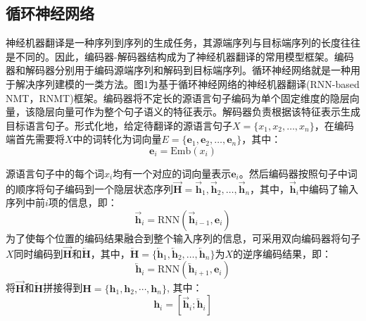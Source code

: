 \subsection{循环神经网络}
神经机器翻译是一种序列到序列的生成任务，其源端序列与目标端序列的长度往往是不同的。因此，编码器-解码器结构成为了神经机器翻译的常用模型框架。编码器和解码器分别用于编码源端序列和解码到目标端序列。循环神经网络就是一种用于解决序列建模的一类方法。图1为基于循环神经网络的神经机器翻译(RNN-based NMT，RNMT)框架。编码器将不定长的源语言句子编码为单个固定维度的隐层向量，该隐层向量可作为整个句子语义的特征表示。解码器负责根据该特征表示生成目标语言句子。形式化地，给定待翻译的源语言句子$X=\{x_1,x_2,…,x_n\}$，在编码端首先需要将$X$中的词转化为词向量$E=\{\boldsymbol{e}_1,\boldsymbol{e}_2,…,\boldsymbol{e}_n\}$，其中：
\begin{equation}
    \boldsymbol{e}_i=\mathrm{Emb}(x_i)
\end{equation}

源语言句子中的每个词$x_i$均有一个对应的词向量表示$\boldsymbol{e}_i$。然后编码器按照句子中词的顺序将句子编码到一个隐层状态序列$\overrightarrow{\boldsymbol{H}}={\overrightarrow{\boldsymbol{h}}_1,\overrightarrow{\boldsymbol{h}}_2,…,\overrightarrow{\boldsymbol{h}}_n}$，其中，$\overrightarrow{\boldsymbol{h}}_i$中编码了输入序列中前$i$项的信息，即：
\begin{equation}
    \overrightarrow{\boldsymbol{h}}_i=\mathrm{RNN}(\overrightarrow{\boldsymbol{h}}_{i-1},\boldsymbol{e}_i)
\end{equation}
为了使每个位置的编码结果融合到整个输入序列的信息，可采用双向编码器将句子$X$同时编码到$\overrightarrow{\boldsymbol{H}}$和$\overleftarrow{\boldsymbol{H}}$，其中，$\overleftarrow{\boldsymbol{H}}=\{\overleftarrow{\boldsymbol{h}}_1,\overleftarrow{\boldsymbol{h}}_2,…,\overleftarrow{\boldsymbol{h}}_n\}$为$X$的逆序编码结果，即：
\begin{equation}
    \overleftarrow{\boldsymbol{h}}_i=\mathrm{RNN}(\overleftarrow{\boldsymbol{h}}_{i+1},\boldsymbol{e}_i)
\end{equation}
将$\overrightarrow{\boldsymbol{H}}$和$\overleftarrow{\boldsymbol{H}}$拼接得到$\boldsymbol{H}=\{\boldsymbol{h}_1,\boldsymbol{h}_2,\cdots,\boldsymbol{h}_n\}$, 其中：
\begin{equation}
    \boldsymbol{h}_i=[\overrightarrow{\boldsymbol{h}}_i;\overleftarrow{\boldsymbol{h}}_i]
\end{equation}

